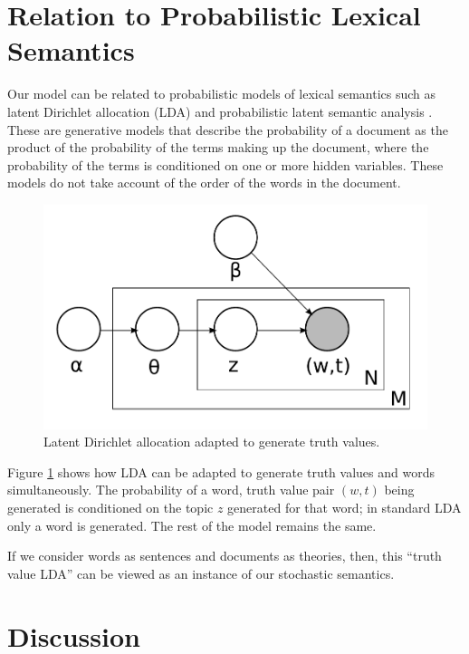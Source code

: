 \documentclass[11pt]{article}
\theoremstyle{definition}
\begin{document}
\section{Relation to Probabilistic Lexical Semantics}


Our model can be related to probabilistic models of lexical semantics
such as latent Dirichlet allocation (LDA) \cite{Blei:03} and
probabilistic latent semantic analysis \cite{Hofmann:99}. These are
generative models that describe the probability of a document as the
product of the probability of the terms making up the document, where
the probability of the terms is conditioned on one or more hidden
variables. These models do not take account of the order of the words
in the document.

\begin{figure}
\includegraphics[width=\linewidth]{LDA.pdf}
\caption{Latent Dirichlet allocation adapted to generate truth values.}
\label{figure:lda}
\end{figure}

Figure \ref{figure:lda} shows how LDA can be adapted to generate truth
values and words simultaneously. The probability of a word, truth
value pair $(w,t)$ being generated is conditioned on the topic $z$
generated for that word; in standard LDA only a word is generated. The
rest of the model remains the same.

If we consider words as sentences and documents as theories, then,
this ``truth value LDA'' can be viewed as an instance of our
stochastic semantics.

\section{Discussion}
\end{document}

